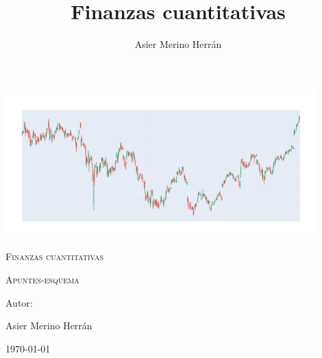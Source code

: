 \documentclass{article}
\title{Finanzas cuantitativas}
\author{Asier Merino Herrán}
\begin{document}
\begin{titlepage}
    \centering
    \vspace{3cm}
    {\includegraphics[width=0.9\textwidth]{newplot.png}\par}
    \vspace{5cm}
    {\scshape\Huge Finanzas cuantitativas \par}
    \vspace{2cm}
    {\scshape\LARGE Apuntes-esquema \par}
    \vfill
    {\Large Autor:  \par}
    {\Large Asier Merino Herrán \par}
    \vfill
    {\Large \today \par}
\end{titlepage}


\cleardoublepage\tableofcontents
\setcounter{page}{1}


\cleardoublepage
\newpage

\newpage

\newpage

\newpage

\newpage



\cleardoublepage
\end{document}
